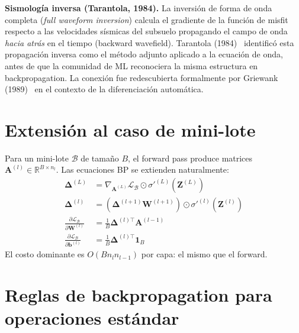 \textbf{Sismología inversa (Tarantola, 1984).}
La inversión de forma de onda completa (\textit{full waveform inversion})
calcula el gradiente de la función de misfit respecto a las velocidades
sísmicas del subsuelo propagando el campo de onda \emph{hacia atrás} en
el tiempo (backward wavefield). Tarantola
(1984)~\cite{tarantola1984inversion} identificó esta propagación inversa
como el método adjunto aplicado a la ecuación de onda, antes de que la
comunidad de ML reconociera la misma estructura en backpropagation. La
conexión fue redescubierta formalmente por Griewank
(1989)~\cite{griewank2008evaluating} en el contexto de la diferenciación
automática.

\section{Extensión al caso de mini-lote}
\label{sec:bp_batch}


Para un mini-lote $\mathcal{B}$ de tamaño $B$, el forward pass produce
matrices $\bm{A}^{(l)} \in \mathbb{R}^{B \times n_l}$. Las ecuaciones BP
se extienden naturalmente:
\begin{align}
  \bm{\Delta}^{(L)} &= \nabla_{\bm{A}^{(L)}}\mathcal{L}_{\mathcal{B}}
  \odot \sigma'^{(L)}(\bm{Z}^{(L)}) \tag{BP1-B}\\
  \bm{\Delta}^{(l)} &= (\bm{\Delta}^{(l+1)}\bm{W}^{(l+1)})
  \odot \sigma'^{(l)}(\bm{Z}^{(l)}) \tag{BP2-B}\\
  \frac{\partial\mathcal{L}_{\mathcal{B}}}{\partial\bm{W}^{(l)}}
  &= \frac{1}{B}\bm{\Delta}^{(l)\top}\bm{A}^{(l-1)} \tag{BP3-B}\\
  \frac{\partial\mathcal{L}_{\mathcal{B}}}{\partial\bm{b}^{(l)}}
  &= \frac{1}{B}\bm{\Delta}^{(l)\top}\bm{1}_B \tag{BP4-B}
\end{align}
El costo dominante es $O(Bn_ln_{l-1})$ por capa: el mismo que el forward.

\section{Reglas de backpropagation para operaciones estándar}
\label{sec:tabla_bp}

